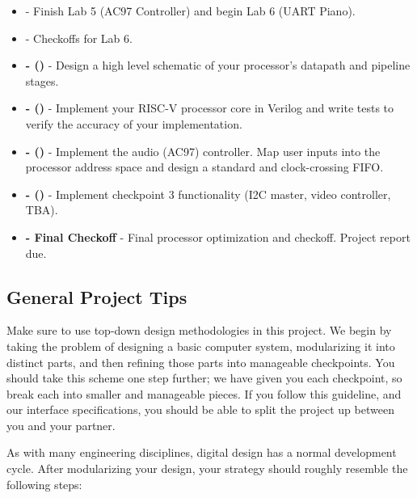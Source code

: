 \documentclass[11pt]{article}
\begin{document}
\begin{itemize}
	\item \textbf{\labFiveDueDate} - Finish Lab 5 (AC97 Controller) and begin Lab 6 (UART Piano).
	
	\item \textbf{\labSixDueDate} - Checkoffs for Lab 6. 
	
	\item \textbf{\blockDiagramDueDate \space - \blockDiagramTaskName \space (\blockDiagramTimeAlloted)} - Design a high level schematic of your processor's datapath and pipeline stages. 
	
	\item \textbf{\baseCPUDueDate \space - \baseCPUTaskName \space (\baseCPUTimeAlloted)} - Implement your RISC-V processor core in Verilog and write tests to verify the accuracy of your implementation.

	\item \textbf{\audioDueDate \space - \audioTaskName \space (\audioTimeAlloted)} - Implement the audio (AC97) controller. Map user inputs into the processor address space and design a standard and clock-crossing FIFO.
	
	\item \textbf{\ethernetDueDate \space - \ethernetTaskName \space (\ethernetTimeAlloted)} - Implement checkpoint 3 functionality (I2C master, video controller, TBA). 
	
	\item \textbf{\finalCheckoffDueDate \space - Final Checkoff} - Final processor optimization and checkoff. Project report due.
\end{itemize}

\subsection{General Project Tips}
\label{tips}

Make sure to use top-down design methodologies in this project.  We begin by taking the problem of designing a basic computer system, modularizing it into distinct parts, and then refining those parts into manageable checkpoints.  You should take this scheme one step further; we have given you each checkpoint, so break each into smaller and manageable pieces.  If you follow this guideline, and our interface specifications, you should be able to split the project up between you and your partner.

As with many engineering disciplines, digital design has a normal development cycle.  After modularizing your design, your strategy should roughly resemble the following steps:
\end{document}
